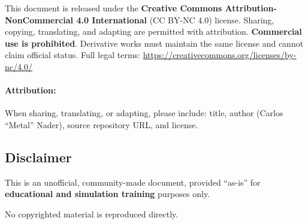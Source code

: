\documentclass[11pt, a4paper, twoside]{report}
\begin{document}
This document is released under the \textbf{Creative Commons Attribution-NonCommercial 4.0 International} (CC BY-NC 4.0) license. Sharing, copying, translating, and adapting are permitted with attribution. \textbf{Commercial use is prohibited}. Derivative works must maintain the same license and cannot claim official status. Full legal terms: \url{https://creativecommons.org/licenses/by-nc/4.0/}

\paragraph{Attribution:}
When sharing, translating, or adapting, please include: title, author (Carlos ``Metal'' Nader), source repository URL, and license.

\subsection{Disclaimer}
\label{sec:C1-S4-S4}

This is an unofficial, community-made document, provided ``as-is'' for \textbf{educational and simulation training} purposes only.

No copyrighted material is reproduced directly.

\end{document}
